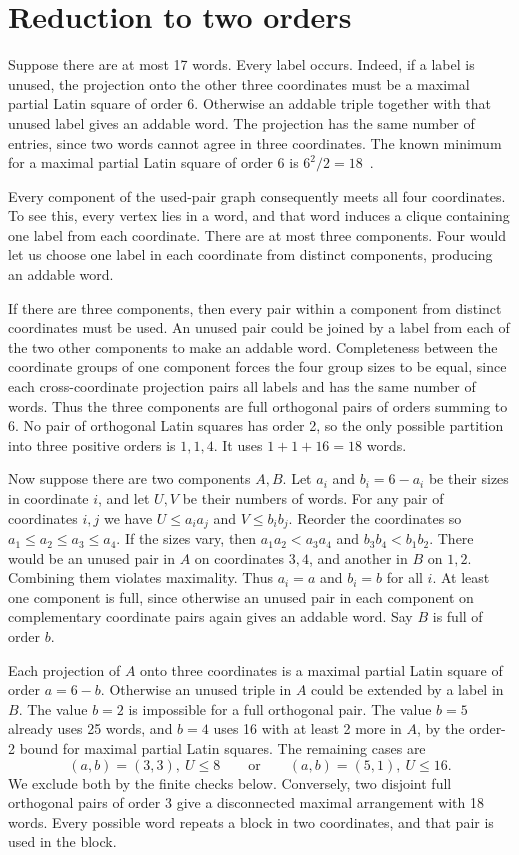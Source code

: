 \documentclass[11pt]{article}
\begin{document}
\section{Reduction to two orders}

Suppose there are at most 17 words. Every label occurs. Indeed,
if a label is unused, the projection onto the other three
coordinates must be a maximal partial Latin square of order 6.
Otherwise an addable triple together with that unused label gives
an addable word. The projection has the same number of entries,
since two words cannot agree in three coordinates. The known
minimum for a maximal partial Latin square of order 6 is
\(6^2/2=18\)~\cite[Section~1]{dgy2}.

Every component of the used-pair graph consequently meets all
four coordinates. To see this, every vertex lies in a word,
and that word induces a clique containing one label from
each coordinate. There are at most three components. Four would
let us choose one label in each coordinate from distinct
components, producing an addable word.

If there are three components, then every pair within a component
from distinct coordinates must be used. An unused pair could be
joined by a label from each of the two other components to make an
addable word. Completeness between the coordinate groups of one
component forces the four group sizes to be equal, since each
cross-coordinate projection pairs all labels and has the same
number of words. Thus the three components are full orthogonal
pairs of orders summing to 6. No pair of orthogonal Latin squares
has order 2, so the only possible partition into three positive
orders is \(1,1,4\). It uses \(1+1+16=18\) words.

Now suppose there are two components \(A,B\). Let \(a_i\) and
\(b_i=6-a_i\) be their sizes in coordinate \(i\), and let \(U,V\)
be their numbers of words. For any pair of coordinates \(i,j\)
we have \(U\le a_i a_j\) and \(V\le b_i b_j\). Reorder the
coordinates so \(a_1\le a_2\le a_3\le a_4\). If the sizes vary,
then \(a_1a_2<a_3a_4\) and \(b_3b_4<b_1b_2\). There would
be an unused pair in \(A\) on coordinates \(3,4\), and another
in \(B\) on \(1,2\). Combining them violates maximality.
Thus \(a_i=a\) and \(b_i=b\) for all \(i\).
At least one component is full, since otherwise an unused pair
in each component on complementary coordinate pairs again
gives an addable word. Say \(B\) is full of order \(b\).

Each projection of \(A\) onto three coordinates is a maximal
partial Latin square of order \(a=6-b\). Otherwise an unused
triple in \(A\) could be extended by a label in \(B\).
The value \(b=2\) is impossible for a full orthogonal pair.
The value \(b=5\) already uses 25 words, and \(b=4\) uses 16
with at least 2 more in \(A\), by the order-2 bound for
maximal partial Latin squares. The remaining cases are
\[
(a,b)=(3,3),\ U\le8
\qquad\text{or}\qquad
(a,b)=(5,1),\ U\le16.
\]
We exclude both by the finite checks below. Conversely,
two disjoint full orthogonal pairs of order 3 give a
disconnected maximal arrangement with 18 words.
Every possible word repeats a block in two coordinates,
and that pair is used in the block.
\end{document}
